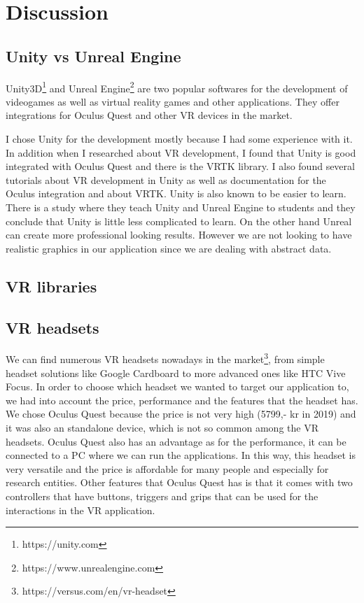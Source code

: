 \section{Discussion}

\subsection{Unity vs Unreal Engine}
Unity3D\footnote{https://unity.com} and Unreal Engine\footnote{https://www.unrealengine.com} are two popular softwares for the development of videogames as well as virtual reality games and other applications. They offer integrations for Oculus Quest and other VR devices in the market.

I chose Unity for the development mostly because I had some experience with it. In addition when I researched about VR development, I found that Unity is good integrated with Oculus Quest and there is the VRTK library. I also found several tutorials about VR development in Unity as well as documentation for the Oculus integration and about VRTK. Unity is also known to be easier to learn. There is a study where they teach Unity and Unreal Engine to students and they conclude that Unity is little less complicated to learn\cite{unity_vs_unreal}. On the other hand Unreal can create more professional looking results. However we are not looking to have realistic graphics in our application since we are dealing with abstract data.

\subsection{VR libraries}

\subsection{VR headsets}
We can find numerous VR headsets nowadays in the market\footnote{https://versus.com/en/vr-headset}, from simple headset solutions like Google Cardboard to more advanced ones like HTC Vive Focus. In order to choose which headset we wanted to target our application to, we had into account the price, performance and the features that the headset has. We chose Oculus Quest because the price is not very high (5799,- kr in 2019) and it was also an standalone device, which is not so common among the VR headsets. Oculus Quest also has an advantage as for the performance, it can be connected to a PC where we can run the applications. In this way, this headset is very versatile and the price is affordable for many people and especially for research entities. Other features that Oculus Quest has is that it comes with two controllers that have buttons, triggers and grips that can be used for the interactions in the VR application.
